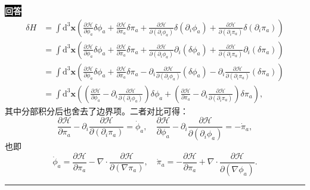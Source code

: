 \documentclass[11pt,a4paper]{ctexart}
\newenvironment{answer}
  {\par\smallskip\noindent
   \begingroup
   \setlength{\fboxsep}{4pt}%
   \colorbox{black}{\textcolor{white}{\bfseries 回答}}%
   \endgroup
   \quad\ignorespaces}
  {\par\smallskip\noindent\rule{\linewidth}{0.4pt}\medskip}
\begin{document}
\begin{answer}
  \begin{equation}
    \begin{aligned}
      \delta H
      &=\int \mathrm{d}^3\bm{x} \left(\frac{\partial\mathcal{H} }{\partial \phi_a }\delta\phi_a + \frac{\partial\mathcal{H} }{\partial \pi_a }\delta\pi_a + \frac{\partial\mathcal{H} }{\partial (\partial_i \phi_a) }\delta(\partial_i \phi_a) + \frac{\partial\mathcal{H} }{\partial (\partial_i \pi_a) }\delta(\partial_i \pi_a) \right) \\
      &=\int \mathrm{d}^3\bm{x} \left(\frac{\partial\mathcal{H} }{\partial \phi_a }\delta\phi_a + \frac{\partial\mathcal{H} }{\partial \pi_a }\delta\pi_a + \frac{\partial\mathcal{H} }{\partial (\partial_i \phi_a) }\partial_i(\delta \phi_a) + \frac{\partial\mathcal{H} }{\partial (\partial_i \pi_a) }\partial_i(\delta \pi_a) \right) \\
      &=\int \mathrm{d}^3\bm{x} \left(\frac{\partial\mathcal{H} }{\partial \phi_a }\delta\phi_a + \frac{\partial\mathcal{H} }{\partial \pi_a }\delta\pi_a - \partial_i\frac{\partial\mathcal{H} }{\partial (\partial_i \phi_a) }(\delta \phi_a) - \partial_i\frac{\partial\mathcal{H} }{\partial (\partial_i \pi_a) }(\delta \pi_a) \right) \\
      &=\int \mathrm{d}^3\bm{x} \left(\left(\frac{\partial\mathcal{H} }{\partial\phi_a }-\partial_i\frac{\partial\mathcal{H} }{\partial\left(\partial_i\phi_a \right) } \right)\delta\phi_a + \left(\frac{\partial\mathcal{H} }{\partial\pi_a } - \partial_i\frac{\partial\mathcal{H} }{\partial\left(\partial_i\pi_a \right) }   \right)\delta\pi_a   \right),
    \end{aligned}
  \end{equation}
  其中分部积分后也舍去了边界项。二者对比可得：
  \begin{equation}
    \frac{\partial\mathcal{H} }{\partial\pi_a } - \partial_i\frac{\partial\mathcal{H} }{\partial\left(\partial_i\pi_a \right) }
    =\dot{\phi}_a,\quad
    \frac{\partial\mathcal{H} }{\partial\phi_a }-\partial_i\frac{\partial\mathcal{H} }{\partial\left(\partial_i\phi_a \right) }
    =-\dot{\pi}_a,
  \end{equation}
  也即
  \begin{equation}
    \dot{\phi}_a
    =\frac{\partial\mathcal{H} }{\partial\pi_a } - \nabla\cdot\frac{\partial\mathcal{H} }{\partial\left(\nabla\pi_a \right) },\quad
    \dot{\pi}_a
    =-\frac{\partial\mathcal{H} }{\partial\pi_a } + \nabla\cdot\frac{\partial\mathcal{H} }{\partial\left(\nabla\phi_a \right) }. 
  \end{equation}
\end{answer}
\end{document}
